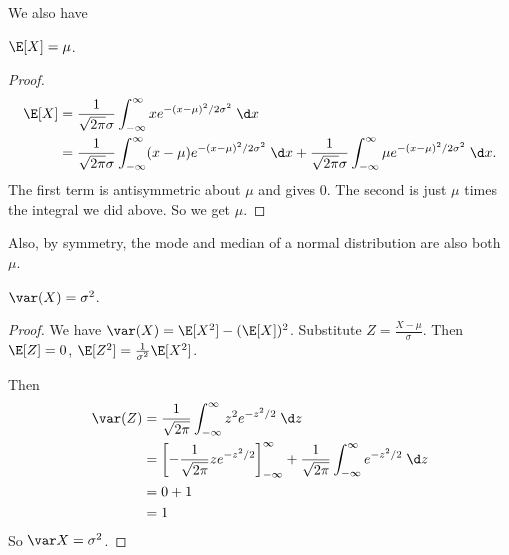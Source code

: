 \documentclass[a4paper]{article}
\begin{document}
We also have
\begin{prop}
  $\E[X] = \mu$.
\end{prop}
\begin{proof}
\begin{align*}
  \E[X] &= \frac{1}{\sqrt{2\pi}\sigma} \int_{-\infty}^\infty x e^{-(x - \mu)^2/2\sigma^2}\;\d x\\
  &= \frac{1}{\sqrt{2\pi} \sigma}\int_{-\infty}^\infty (x - \mu)e^{-(x - \mu)^2/2\sigma^2}\;\d x + \frac{1}{\sqrt{2\pi}\sigma}\int_{-\infty}^\infty \mu e^{-(x - \mu)^2/2\sigma^2}\;\d x.
\end{align*}
The first term is antisymmetric about $\mu$ and gives $0$. The second is just $\mu$ times the integral we did above. So we get $\mu$.
\end{proof}
Also, by symmetry, the mode and median of a normal distribution are also both $\mu$.

\begin{prop}
  $\var(X) = \sigma^2$.
\end{prop}

\begin{proof}
  We have $\var (X) = \E[X^2] - (\E[X])^2$. Substitute $Z = \frac{X - \mu}{\sigma}$. Then $\E[Z] = 0$, $\E[Z^2] = \frac{1}{\sigma^2}\E[X^2]$.

  Then
  \begin{align*}
    \var(Z) &= \frac{1}{\sqrt{2\pi}}  \int_{-\infty}^\infty z^2 e^{-z^2/2}\;\d z\\
    &= \left[-\frac{1}{\sqrt{2\pi}}ze^{-z^2/2}\right]_{-\infty}^\infty + \frac{1}{\sqrt{2\pi}}\int_{-\infty}^\infty e^{-z^2/2}\;\d z\\
    &= 0 + 1\\
    &= 1
  \end{align*}
  So $\var X = \sigma^2$.
\end{proof}
\end{document}

